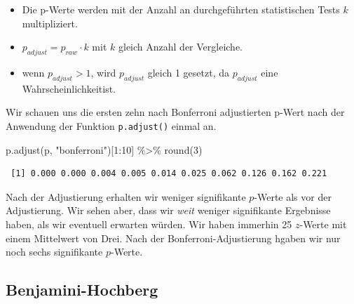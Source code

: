 \documentclass[
  letterpaper,
]{scrbook}
\newenvironment{Shaded}{\begin{snugshade}}{\end{snugshade}}
\newcommand{\DecValTok}[1]{\textcolor[rgb]{0.68,0.00,0.00}{#1}}
\newcommand{\FunctionTok}[1]{\textcolor[rgb]{0.28,0.35,0.67}{#1}}
\newcommand{\NormalTok}[1]{\textcolor[rgb]{0.00,0.23,0.31}{#1}}
\newcommand{\SpecialCharTok}[1]{\textcolor[rgb]{0.37,0.37,0.37}{#1}}
\newcommand{\StringTok}[1]{\textcolor[rgb]{0.13,0.47,0.30}{#1}}
\providecommand{\tightlist}{%
  \setlength{\itemsep}{0pt}\setlength{\parskip}{0pt}}\usepackage{longtable,booktabs,array}
\begin{document}
\begin{tcolorbox}[enhanced jigsaw, coltitle=black, titlerule=0mm, bottomrule=.15mm, opacityback=0, opacitybacktitle=0.6, leftrule=.75mm, title=\textcolor{quarto-callout-important-color}{\faExclamation}\hspace{0.5em}{Adjustierung des \(\boldsymbol{p}\)-Wertes}, toprule=.15mm, bottomtitle=1mm, toptitle=1mm, left=2mm, breakable, arc=.35mm, colback=white, rightrule=.15mm, colbacktitle=quarto-callout-important-color!10!white, colframe=quarto-callout-important-color-frame]

\begin{itemize}
\tightlist
\item
  Die p-Werte werden mit der Anzahl an durchgeführten statistischen
  Tests \(k\) multipliziert.
\item
  \(p_{adjust} = p_{raw} \cdot k\) mit \(k\) gleich Anzahl der
  Vergleiche.
\item
  wenn \(p_{adjust} > 1\), wird \(p_{adjust}\) gleich 1 gesetzt, da
  \(p_{adjust}\) eine Wahrscheinlichkeitist.
\end{itemize}

\end{tcolorbox}

Wir schauen uns die ersten zehn nach Bonferroni adjustierten p-Wert nach
der Anwendung der Funktion \texttt{p.adjust()} einmal an.

\begin{Shaded}
\begin{Highlighting}[]
\FunctionTok{p.adjust}\NormalTok{(p, }\StringTok{"bonferroni"}\NormalTok{)[}\DecValTok{1}\SpecialCharTok{:}\DecValTok{10}\NormalTok{] }\SpecialCharTok{\%\textgreater{}\%} \FunctionTok{round}\NormalTok{(}\DecValTok{3}\NormalTok{)}
\end{Highlighting}
\end{Shaded}

\begin{verbatim}
 [1] 0.000 0.000 0.004 0.005 0.014 0.025 0.062 0.126 0.162 0.221
\end{verbatim}

Nach der Adjustierung erhalten wir weniger signifikante \(p\)-Werte als
vor der Adjustierung. Wir sehen aber, dass wir \emph{weit} weniger
signifikante Ergebnisse haben, als wir eventuell erwarten würden. Wir
haben immerhin 25 \(z\)-Werte mit einem Mittelwert von Drei. Nach der
Bonferroni-Adjustierung hgaben wir nur noch sechs signifikante
\(p\)-Werte.

\hypertarget{benjamini-hochberg}{%
\subsection{Benjamini-Hochberg}\label{benjamini-hochberg}}
\end{document}
